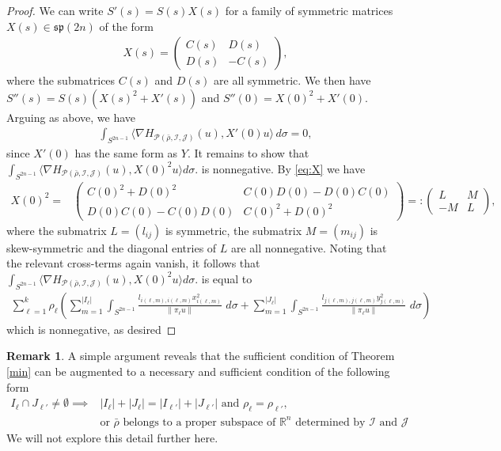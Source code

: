 \documentclass[12pt]{amsart}
\theoremstyle{definition}
\newtheorem{remark}[theorem]{Remark}
\newcommand{\RR}{{\mathbb R}}
\begin{document}
\begin{proof}
We can write $S'(s) = S(s)X(s)$ for a family of symmetric matrices $X(s) \in \mathfrak{sp}(2n)$ of the form 
\begin{align}\label{eq:X}
    X(s) = \begin{pmatrix}
    C(s) & D(s)\\
    D(s) & -C(s)
    \end{pmatrix},
\end{align}
where the submatrices $C(s)$ and $D(s)$ are all symmetric. We then have $S''(s) = S(s) (X(s)^2 + X'(s))$ and $S''(0) = X(0)^2 + X'(0)$. Arguing as above, we have 
\begin{align*}
    \int_{S^{2n-1}} \langle \nabla  H_{\mathcal{P}(\bar{\rho},\mathcal{I},\mathcal{J})}(u), X'(0)u \rangle \, d\sigma = 0,
\end{align*}
since $X'(0)$ has the same form as $Y$. It remains to show that 
$
    \int_{S^{2n-1}} \langle \nabla  H_{\mathcal{P}(\bar{\rho},\mathcal{I},\mathcal{J})}(u), X(0)^2u \rangle d\sigma.
$ is nonnegative.
By \eqref{eq:X}  we have 
\begin{align*}
    X(0)^2 =&\begin{pmatrix}
    C(0)^2+D(0)^2 & C(0)D(0) - D(0)C(0)\\
    D(0)C(0) - C(0)D(0) & C(0)^2 +D(0)^2
    \end{pmatrix}=:    \begin{pmatrix}
    L & M\\
    -M & L
    \end{pmatrix},
\end{align*}
where the submatrix $L =(l_{ij})$ is symmetric, the submatrix $M=(m_{ij})$ is skew-symmetric and the diagonal entries of $L$ are all nonnegative. 
Noting that the relevant  cross-terms again vanish, it follows that $
    \int_{S^{2n-1}} \langle \nabla  H_{\mathcal{P}(\bar{\rho},\mathcal{I},\mathcal{J})}(u), X(0)^2u \rangle d\sigma.
$ is equal to 
\begin{align*}
    \sum_{\ell=1}^k\rho_\ell\left(\sum_{m=1}^{|I_{\ell}|} \int_{S^{2n-1}} \frac{ l_{i(\ell, m), i(\ell, m)} x_{i(\ell, m)}^2}{\|\pi_\ell u\|} \, \, d \sigma + \sum_{m = 1}^{|J_\ell|} \int_{S^{2n-1}} \frac{ l_{j(\ell, m), j(\ell, m)}y_{j(\ell, m)}^2}{\|\pi_\ell u\|} \, \, d \sigma \right) 
    \end{align*}
which is nonnegative, as desired



\end{proof}
\begin{remark}  A simple argument reveals that the sufficient condition of Theorem \ref{min} can be augmented to a necessary and sufficient condition of the following form  
\begin{align*}
I_\ell \cap J_{\ell'} \neq \emptyset    \implies&    |I_\ell| + |J_\ell| = |I_{\ell'}| + |J_{\ell'}| \text{ and  } \rho_\ell=\rho_{\ell'}, \\
&\text{or $\bar{\rho}$ belongs to a proper subspace of $\RR^{n}$ determined by $\mathcal{I}$ and $\mathcal{J}$}
\end{align*}
We will not explore this detail further here. 
\end{remark}
\end{document}
